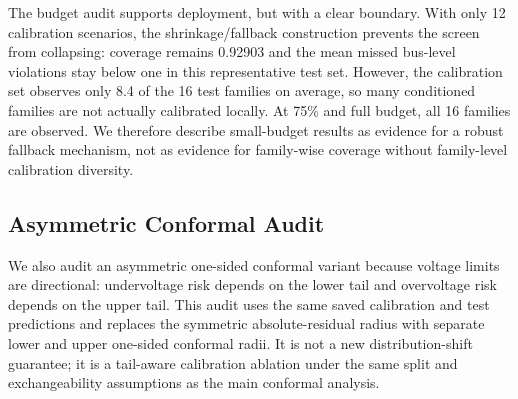 \documentclass[
  preprint,12pt]{elsarticle}
\begin{document}
The budget audit supports deployment, but with a clear boundary. With
only 12 calibration scenarios, the shrinkage/fallback construction
prevents the screen from collapsing: coverage remains 0.92903 and the
mean missed bus-level violations stay below one in this representative
test set. However, the calibration set observes only 8.4 of the 16 test
families on average, so many conditioned families are not actually
calibrated locally. At 75\% and full budget, all 16 families are
observed. We therefore describe small-budget results as evidence for a
robust fallback mechanism, not as evidence for family-wise coverage
without family-level calibration diversity.

\subsection{Asymmetric Conformal
Audit}\label{asymmetric-conformal-audit}

We also audit an asymmetric one-sided conformal variant because voltage
limits are directional: undervoltage risk depends on the lower tail and
overvoltage risk depends on the upper tail. This audit uses the same
saved calibration and test predictions and replaces the symmetric
absolute-residual radius with separate lower and upper one-sided
conformal radii. It is not a new distribution-shift guarantee; it is a
tail-aware calibration ablation under the same split and exchangeability
assumptions as the main conformal analysis.
\end{document}
